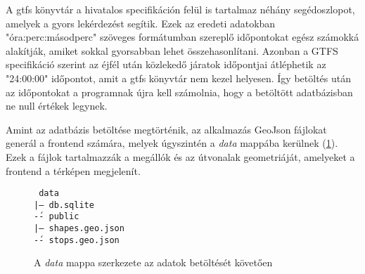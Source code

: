 A gtfs könyvtár a hivatalos specifikáción felül is tartalmaz néhány segédoszlopot, amelyek a gyors lekérdezést segítik. Ezek az eredeti adatokban "óra:perc:másodperc" szöveges formátumban szereplő időpontokat egész számokká alakítják, amiket sokkal gyorsabban lehet összehasonlítani. Azonban a GTFS specifikáció szerint az éjfél után közlekedő járatok időpontjai átléphetik az "24:00:00" időpontot, amit a gtfs könyvtár nem kezel helyesen. Így betöltés után az időpontokat a programnak újra kell számolnia, hogy a betöltött adatbázisban ne null értékek legynek.

Amint az adatbázis betöltése megtörténik, az alkalmazás GeoJson fájlokat generál a frontend számára, melyek úgyszintén a \textit{data} mappába kerülnek (\ref{fig:data-folder-structure}). Ezek a fájlok tartalmazzák a megállók és az útvonalak geometriáját, amelyeket a frontend a térképen megjelenít.

\begin{figure}[H]
    \texttt{
        data\\
        |-- db.sqlite\\
        \'-- public\\
        \hspace{1em} |-- shapes.geo.json\\
        \hspace{1em} \'-- stops.geo.json
    }
    \caption{A \textit{data} mappa szerkezete az adatok betöltését követően}
    \label{fig:data-folder-structure}
\end{figure}

